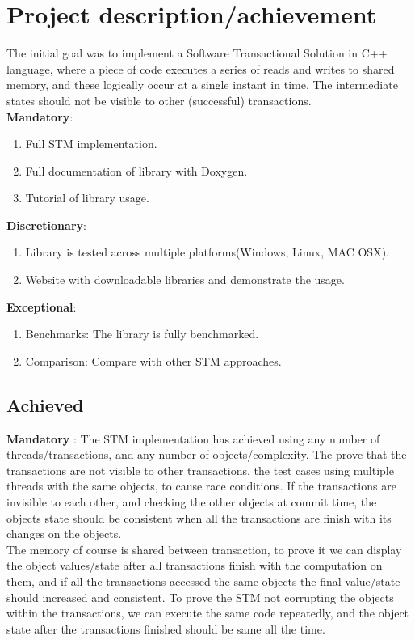 \documentclass[12pt]{article}
\begin{document}
\section{Project description/achievement}
The initial goal was to implement a Software Transactional Solution in C++ language, where a piece of code executes a series of reads and writes to shared memory, and these logically occur at a single instant in time. The intermediate states should not be visible to other (successful) transactions.\\
\textbf{Mandatory}:
\begin{enumerate}
\item Full STM implementation. 
\item Full documentation of library with Doxygen.
\item Tutorial of library usage.
\end{enumerate}
\textbf{Discretionary}:
\begin{enumerate}
\item Library is tested across multiple platforms(Windows, Linux, MAC OSX). 
\item Website with downloadable libraries and demonstrate the usage.
\end{enumerate}
\textbf{Exceptional}:
\begin{enumerate}
\item Benchmarks: The library is fully benchmarked. 
\item Comparison: Compare with other STM approaches.
\end{enumerate}
\subsection{Achieved}
\textbf{Mandatory} : The STM implementation has achieved using any number of threads/transactions, and any number of objects/complexity. The prove that the transactions are not visible to other transactions, the test cases using multiple threads with the same objects, to cause race conditions. If the transactions are invisible to each other, and checking the other objects at commit time, the objects state should be consistent when all the transactions are finish with its changes on the objects.\\
The memory of course is shared between transaction, to prove it we can display the object values/state after all transactions finish with the computation on them, and if all the transactions accessed the same objects the final value/state should increased and consistent. To prove the STM not corrupting the objects within the transactions, we can execute the same code repeatedly, and the object state after the transactions finished should be same all the time.\\
\end{document}
